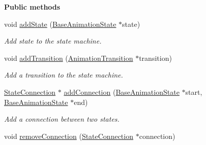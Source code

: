 \begin{Indent}\textbf{ Public methods}\par
\begin{DoxyCompactItemize}
\item 
\mbox{\label{classrev_1_1_animation_state_machine_a2446c53cbd86e88bac273ecd3a70f4d4}} 
void \mbox{\hyperlink{classrev_1_1_animation_state_machine_a2446c53cbd86e88bac273ecd3a70f4d4}{add\+State}} (\mbox{\hyperlink{classrev_1_1_base_animation_state}{Base\+Animation\+State}} $\ast$state)
\begin{DoxyCompactList}\small\item\em Add state to the state machine. \end{DoxyCompactList}\item 
\mbox{\label{classrev_1_1_animation_state_machine_a623b98e18bec9f5c3e852592d4c86a5f}} 
void \mbox{\hyperlink{classrev_1_1_animation_state_machine_a623b98e18bec9f5c3e852592d4c86a5f}{add\+Transition}} (\mbox{\hyperlink{classrev_1_1_animation_transition}{Animation\+Transition}} $\ast$transition)
\begin{DoxyCompactList}\small\item\em Add a transition to the state machine. \end{DoxyCompactList}\item 
\mbox{\label{classrev_1_1_animation_state_machine_a3b7a0e3aaf19c4ba9eeb78fc2ba69b02}} 
\mbox{\hyperlink{classrev_1_1_state_connection}{State\+Connection}} $\ast$ \mbox{\hyperlink{classrev_1_1_animation_state_machine_a3b7a0e3aaf19c4ba9eeb78fc2ba69b02}{add\+Connection}} (\mbox{\hyperlink{classrev_1_1_base_animation_state}{Base\+Animation\+State}} $\ast$start, \mbox{\hyperlink{classrev_1_1_base_animation_state}{Base\+Animation\+State}} $\ast$end)
\begin{DoxyCompactList}\small\item\em Add a connection between two states. \end{DoxyCompactList}\item 
\mbox{\label{classrev_1_1_animation_state_machine_aeeb3fd7eacc8d265a39c0b4aae955c7b}} 
void \mbox{\hyperlink{classrev_1_1_animation_state_machine_aeeb3fd7eacc8d265a39c0b4aae955c7b}{remove\+Connection}} (\mbox{\hyperlink{classrev_1_1_state_connection}{State\+Connection}} $\ast$connection)

\end{DoxyCompactItemize}
\end{Indent}
